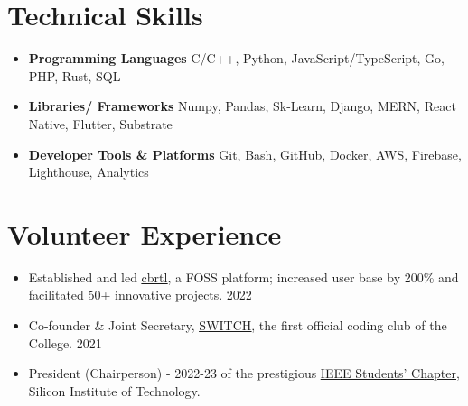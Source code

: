 \documentclass[letterpaper,11pt]{article}
\newcommand{\resumeItem}[1]{
  \item\small{
    {#1 \vspace{-2pt}}
  }
}
\newcommand{\resumeSubItem}[1]{\resumeItem{#1}\vspace{-4pt}}
\newcommand{\resumeSubHeadingListStart}{\begin{itemize}[leftmargin=0.15in, label={}]}
\newcommand{\resumeSubHeadingListEnd}{\end{itemize}}
\begin{document}
%

\section{Technical Skills}
  \resumeSubHeadingListStart
    \resumeSubItem{\textbf{Programming Languages}}
      {C/C++, Python, JavaScript/TypeScript, Go, PHP, Rust, SQL}
    \resumeSubItem{\textbf{Libraries/ Frameworks}}
      {Numpy, Pandas, Sk-Learn, Django, MERN, React Native, Flutter, Substrate }
    \resumeSubItem{\textbf{Developer Tools \& Platforms}}
      {Git, Bash, GitHub, Docker, AWS, Firebase, Lighthouse, Analytics}
  \resumeSubHeadingListEnd


%

\section{Volunteer Experience}
  \resumeSubHeadingListStart
    \resumeSubItem
    {Established and led \href{https://cbrtl.github.io}{\underline{cbrtl}}, a FOSS platform; increased user base by 200\% and facilitated 50+ innovative projects. 2022}
    \resumeSubItem
      {Co-founder \& Joint Secretary, \href{https://www.linkedin.com/company/switch-sit/}{\underline{SWITCH}}, the first official coding club of the College. 2021}
    \resumeSubItem
      {President (Chairperson) - 2022-23 of the prestigious \href{https://www.instagram.com/ieeesitbbsr/}{\underline{IEEE Students’ Chapter}}, Silicon Institute of Technology.}
  \resumeSubHeadingListEnd

%


\end{document}
